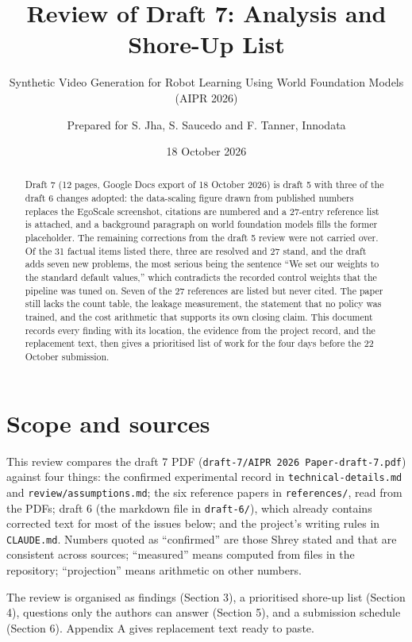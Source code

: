 \documentclass[
  11pt,
]{article}
\title{Review of Draft 7: Analysis and Shore-Up List}
\subtitle{Synthetic Video Generation for Robot Learning Using World
Foundation Models (AIPR 2026)}
\author{Prepared for S. Jha, S. Saucedo and F. Tanner, Innodata}
\date{18 October 2026}
\begin{document}
\maketitle
\begin{abstract}
Draft 7 (12 pages, Google Docs export of 18 October 2026) is draft 5
with three of the draft 6 changes adopted: the data-scaling figure drawn
from published numbers replaces the EgoScale screenshot, citations are
numbered and a 27-entry reference list is attached, and a background
paragraph on world foundation models fills the former placeholder. The
remaining corrections from the draft 5 review were not carried over. Of
the 31 factual items listed there, three are resolved and 27 stand, and
the draft adds seven new problems, the most serious being the sentence
``We set our weights to the standard default values,'' which contradicts
the recorded control weights that the pipeline was tuned on. Seven of
the 27 references are listed but never cited. The paper still lacks the
count table, the leakage measurement, the statement that no policy was
trained, and the cost arithmetic that supports its own closing claim.
This document records every finding with its location, the evidence from
the project record, and the replacement text, then gives a prioritised
list of work for the four days before the 22 October submission.
\end{abstract}

{
\setcounter{tocdepth}{2}
\tableofcontents
}
\section{Scope and sources}\label{scope-and-sources}

This review compares the draft 7 PDF
(\texttt{draft-7/AIPR\ 2026\ Paper-draft-7.pdf}) against four things:
the confirmed experimental record in \texttt{technical-details.md} and
\texttt{review/assumptions.md}; the six reference papers in
\texttt{references/}, read from the PDFs; draft 6 (the markdown file in
\texttt{draft-6/}), which already contains corrected text for most of
the issues below; and the project's writing rules in \texttt{CLAUDE.md}.
Numbers quoted as ``confirmed'' are those Shrey stated and that are
consistent across sources; ``measured'' means computed from files in the
repository; ``projection'' means arithmetic on other numbers.

The review is organised as findings (Section 3), a prioritised shore-up
list (Section 4), questions only the authors can answer (Section 5), and
a submission schedule (Section 6). Appendix A gives replacement text
ready to paste.
\end{document}
